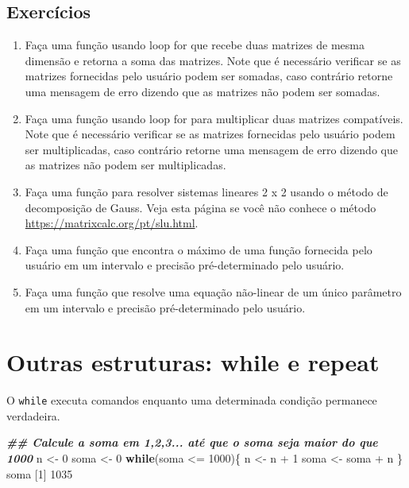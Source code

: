 \documentclass[
  10pt,
  a4paper]{book}
\newenvironment{Shaded}{\begin{snugshade}}{\end{snugshade}}
\newcommand{\ControlFlowTok}[1]{\textcolor[rgb]{0.13,0.29,0.53}{\textbf{#1}}}
\newcommand{\DecValTok}[1]{\textcolor[rgb]{0.00,0.00,0.81}{#1}}
\newcommand{\DocumentationTok}[1]{\textcolor[rgb]{0.56,0.35,0.01}{\textbf{\textit{#1}}}}
\newcommand{\NormalTok}[1]{#1}
\newcommand{\OtherTok}[1]{\textcolor[rgb]{0.56,0.35,0.01}{#1}}
\newcommand{\SpecialCharTok}[1]{\textcolor[rgb]{0.00,0.00,0.00}{#1}}
\providecommand{\tightlist}{%
  \setlength{\itemsep}{0pt}\setlength{\parskip}{0pt}}
\begin{document}
\hypertarget{exercuxedcios-13}{%
\subsection*{Exercícios}\label{exercuxedcios-13}}


\begin{enumerate}
\def\labelenumi{\arabic{enumi}.}
\tightlist
\item
  Faça uma função usando loop for que recebe duas matrizes de mesma dimensão e retorna a soma das matrizes. Note que é necessário verificar se as matrizes fornecidas pelo usuário podem ser somadas, caso contrário retorne uma mensagem de erro dizendo que as matrizes não podem ser somadas.
\item
  Faça uma função usando loop for para multiplicar duas matrizes compatíveis. Note que é necessário verificar se as matrizes fornecidas pelo usuário podem ser multiplicadas, caso contrário retorne uma mensagem de erro dizendo que as matrizes não podem ser multiplicadas.
\item
  Faça uma função para resolver sistemas lineares 2 x 2 usando o método de decomposição de Gauss. Veja esta página se você não conhece o método \url{https://matrixcalc.org/pt/slu.html}.
\item
  Faça uma função que encontra o máximo de uma função fornecida pelo usuário em um intervalo e precisão pré-determinado pelo usuário.
\item
  Faça uma função que resolve uma equação não-linear de um único parâmetro em um intervalo e precisão pré-determinado pelo usuário.
\end{enumerate}

\hypertarget{outras-estruturas-while-e-repeat}{%
\section{Outras estruturas: while e repeat}\label{outras-estruturas-while-e-repeat}}

O \texttt{while} executa comandos enquanto uma determinada condição permanece
verdadeira.

\begin{Shaded}
\begin{Highlighting}[]
\DocumentationTok{\#\# Calcule a soma em 1,2,3... até que o soma seja maior do que 1000}
\NormalTok{n }\OtherTok{\textless{}{-}} \DecValTok{0}
\NormalTok{soma }\OtherTok{\textless{}{-}} \DecValTok{0}
\ControlFlowTok{while}\NormalTok{(soma }\SpecialCharTok{\textless{}=} \DecValTok{1000}\NormalTok{)\{}
\NormalTok{    n }\OtherTok{\textless{}{-}}\NormalTok{ n }\SpecialCharTok{+} \DecValTok{1}
\NormalTok{    soma }\OtherTok{\textless{}{-}}\NormalTok{ soma }\SpecialCharTok{+}\NormalTok{ n}
\NormalTok{\}}
\NormalTok{soma}
\NormalTok{[}\DecValTok{1}\NormalTok{] }\DecValTok{1035}
\end{Highlighting}
\end{Shaded}
\end{document}
